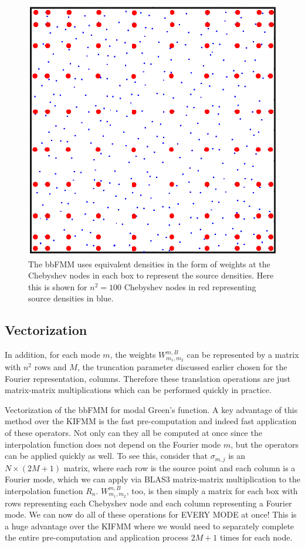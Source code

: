 \documentclass[11pt, oneside]{article}   	%
\begin{document}
\begin{figure}[h]
\caption{The bbFMM uses equivalent densities in the form of weights at the Chebyshev nodes in each box to represent the source densities. Here this is shown for $n^2=100$ Chebyshev nodes in red representing source densities in blue.}
\label{fig:8}
\centering
\includegraphics[scale=0.25]{b0wChebynodes}
\end{figure}

\subsection{Vectorization}
In addition, for each mode $m$, the weights $W^{m,B}_{m_1,m_2}$ can be represented by a matrix with $n^2$ rows and $M$, the truncation parameter discussed earlier chosen for the Fourier representation, columns. Therefore these translation operations are just matrix-matrix multiplications which can be performed quickly in practice.

Vectorization of the bbFMM for modal Green's function. A key advantage of this method over the KIFMM is the fast pre-computation and indeed fast application of these operators. Not only can they all be computed at once since the interpolation function does not depend on the Fourier mode $m$, but the operators can be applied quickly as well. To see this, consider that $\sigma_{m,j}$ is an $N\times (2M+1)$ matrix, where each row is the source point and each column is a Fourier mode, which we can apply via BLAS3 matrix-matrix multiplication to the interpolation function $R_n$. $W_{m_1,m_2}^{m,B}$, too, is then simply a matrix for each box with rows representing each Chebyshev node and each column representing a Fourier mode. We can now do all of these operations for EVERY MODE at once! This is a huge advantage over the KIFMM where we would need to separately complete the entire pre-computation and application process $2M+1$ times for each node.
\\
\end{document}
